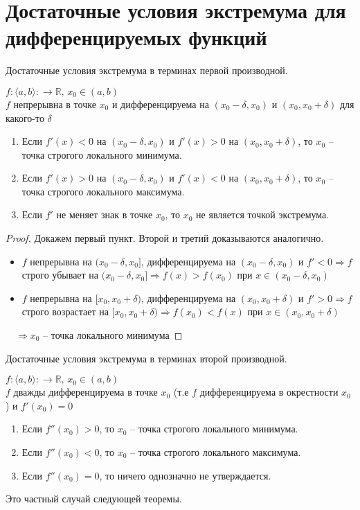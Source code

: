 \section{Достаточные условия экстремума для дифференцируемых функций}
\begin{theorem-non}
    Достаточные условия экстремума в терминах первой производной.

    $f: \langle a, b \rangle: \to \mathbb{R}, \, x_0 \in (a, b)$ \\
    $f$ непрерывна в точке $x_0$ и дифференцируема на $(x_0 - \delta, x_0)$ и $(x_0, x_0 + \delta)$ для какого-то $\delta$
    \begin{enumerate}
        \item Если $f'(x) < 0$ на $(x_0 - \delta, x_0)$ и $f'(x) > 0$ на $(x_0, x_0 + \delta)$, то $x_0$ -- точка строгого локального минимума.
        \item Если $f'(x) > 0$ на $(x_0 - \delta, x_0)$ и $f'(x) < 0$ на $(x_0, x_0 + \delta)$, то $x_0$ -- точка строгого локального максимума.
        \item Если $f'$ не меняет знак в точке $x_0$, то $x_0$ не является точкой экстремума. 
    \end{enumerate}
\end{theorem-non}

\begin{proof}
    Докажем первый пункт. Второй и третий доказываются аналогично.
    \begin{itemize}
        \item $f$ непрерывна на $(x_0 - \delta, x_0]$, дифференцируема на $(x_0 - \delta, x_0)$ и $f' < 0 \Rightarrow f$ строго убывает на $(x_0 - \delta, x_0] \Rightarrow f(x) > f(x_0)$ при $x \in (x_0 - \delta, x_0)$
        \item  $f$ непрерывна на $[x_0, x_0 + \delta)$, дифференцируема на $(x_0, x_0 + \delta)$ и $f' > 0 \Rightarrow f$ строго возрастает на $[x_0, x_0 + \delta) \Rightarrow f(x_0) < f(x)$ при $x \in (x_0, x_0 + \delta)$
    \end{itemize}
    $\quad \Rightarrow x_0$ -- точка локального минимума
\end{proof}

\begin{theorem-non}
    Достаточные условия экстремума в терминах второй производной.

    $f: \langle a, b \rangle: \to \mathbb{R}, \, x_0 \in (a, b)$ \\
    $f$ дважды дифференцируема в точке $x_0$ (т.е $f$ дифференцируема в окрестности $x_0$) и $f'(x_0) = 0$
    \begin{enumerate}
        \item Если $f''(x_0) > 0$, то $x_0$ -- точка строгого локального минимума.
        \item Если $f''(x_0) < 0$, то $x_0$ -- точка строгого локального максимума.
        \item Если $f''(x_0) = 0$, то ничего однозначно не утверждается.
    \end{enumerate}

    Это частный случай следующей теоремы.
\end{theorem-non}

